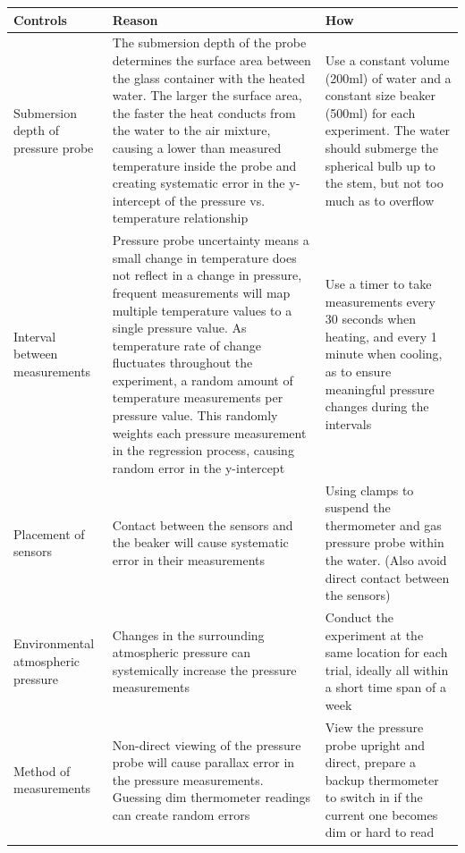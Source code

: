 \documentclass[a4paper,12pt]{article}
\begin{document}
\begin{longtable}{P{0.2\textwidth}|P{0.35\textwidth}|P{0.35\textwidth}}
Controls & Reason & How\\\hline

Submersion depth of pressure probe & The submersion depth of the probe determines the surface area between the glass container with the heated water. The larger the surface area, the faster the heat conducts from the water to the air mixture, causing a lower than measured temperature inside the probe and creating systematic error in the y-intercept of the pressure vs. temperature relationship & Use a constant volume (200ml) of water and a constant size beaker (500ml) for each experiment. The water should submerge the spherical bulb up to the stem, but not too much as to overflow \\

Interval between measurements & Pressure probe uncertainty means a small change in temperature does not reflect in a change in pressure, frequent measurements will map multiple temperature values to a single pressure value. As temperature rate of change fluctuates throughout the experiment, a random amount of temperature measurements per pressure value. This randomly weights each pressure measurement in the regression process, causing random error in the y-intercept & Use a timer to take measurements every 30 seconds when heating, and every 1 minute when cooling, as to ensure meaningful pressure changes during the intervals \\

Placement of sensors & Contact between the sensors and the beaker will cause systematic error in their measurements & Using clamps to suspend the thermometer and gas pressure probe within the water. (Also avoid direct contact between the sensors) \\

Environmental atmospheric pressure & Changes in the surrounding atmospheric pressure can systemically increase the pressure measurements & Conduct the experiment at the same location for each trial, ideally all within a short time span of a week
\\

Method of measurements & Non-direct viewing of the pressure probe will cause parallax error in the pressure measurements. Guessing dim thermometer readings can create random errors & View the pressure probe upright and direct, prepare a backup thermometer to switch in if the current one becomes dim or hard to read \\
\end{longtable}
\end{document}
